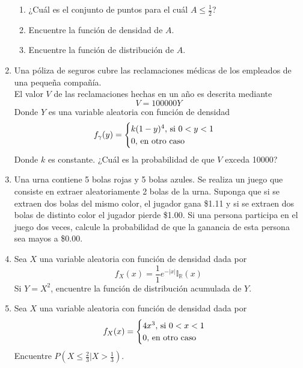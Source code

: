 \documentclass[12pt,a4paper]{report}
\begin{document}
\begin{enumerate}
{\begin{enumerate}
{					¿Cuál es el valor más grande que $A$ puede tomar?
				}
				\item {
					¿Cuál es el conjunto de puntos para el cuál $A \leq \frac{1}{2}$?
				}
				\item {
					Encuentre la función de densidad de $A$.
				}
				\item {
					Encuentre la función de distribución de $A$.
				}
			\end{enumerate}
		}
		\item {
			Una póliza de seguros cubre las reclamaciones médicas de los empleados
			de una pequeña compañía.\\
			El valor $V$ de las reclamaciones hechas en un año es descrita mediante
			\[V = 100000Y\]
			Donde $Y$ es una variable aleatoria con función de densidad
			\[
				f_\gamma(y) = \begin{cases}
												k(1-y)^4, $ si $ 0 < y < 1\\
												0, $ en otro caso$
											\end{cases}
			\]
			Donde $k$ es constante. ¿Cuál es la probabilidad de que $V$ exceda 10000?
			}
		\item {
			Una urna contiene 5 bolas rojas y 5 bolas azules. Se realiza un juego
			que consiste en extraer aleatoriamente 2 bolas de la urna. Suponga que
			si se extraen dos bolas del mismo color, el jugador gana \$1.11 y si se
			extraen dos bolas de distinto color el jugador pierde \$1.00. Si una
			persona participa en el juego dos veces, calcule la probabilidad de que
			la ganancia de esta persona sea mayos a \$0.00.
		}
		\item {
			Sea $X$ una variable aleatoria con función de densidad dada por
			\[f_X(x) = \frac{1}{1}e^{-|x|}\mathbb{I}_{\mathbb{R}}(x)\]
			Si $Y = X^2$, encuentre la función de distribución acumulada de $Y$.
		}
		\item {
			Sea $X$ una variable aleatoria con función de densidad dada por
			\[
				f_X(x) = \begin{cases}
									4x^3, $ si $ 0 < x < 1\\
									0, $ en otro caso$
								 \end{cases}
			\]
			Encuentre $P(X \leq \frac{2}{3}|X > \frac{1}{3})$.
		}
	\end{enumerate}
\end{document}
